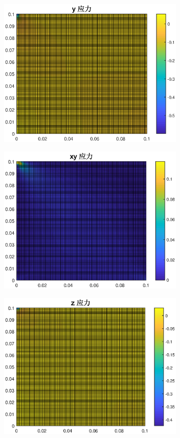 \documentclass[UTF8]{ctexart}
\begin{document}
\begin{figure}[htbp]
\centering\includegraphics[width=3.5in]{stressy.eps}

\end{figure}
\begin{figure}[htbp]
\centering\includegraphics[width=3.5in]{stressxy.eps}

\end{figure}
\begin{figure}[htbp]
\centering\includegraphics[width=3.5in]{stressz.eps}

\end{figure}
\end{document}
